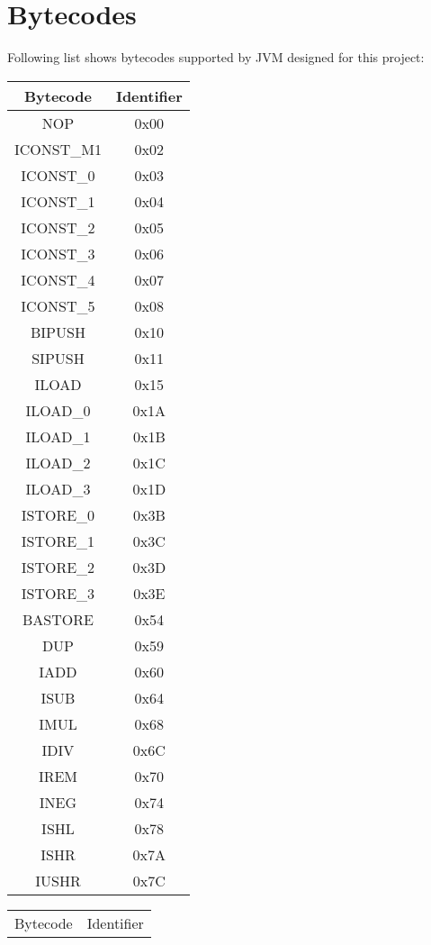 \chapter{Bytecodes}\label{Appx:Bytecodes}
Following list shows bytecodes supported by JVM designed for this project:
\begin{table}[!htb]
\centering
\begin{tabular}{|c|c|}
\hline 
Bytecode & Identifier \\
\hline 
NOP & 0x00 \\
\hline 
ICONST\_M1 & 0x02 \\
\hline 
ICONST\_0 & 0x03 \\
\hline 
ICONST\_1 & 0x04 \\
\hline 
ICONST\_2 & 0x05 \\
\hline 
ICONST\_3 & 0x06 \\
\hline 
ICONST\_4 & 0x07 \\
\hline 
ICONST\_5 & 0x08 \\
\hline 
BIPUSH & 0x10 \\
\hline 
SIPUSH & 0x11 \\
\hline 
ILOAD & 0x15 \\
\hline 
ILOAD\_0 & 0x1A \\
\hline 
ILOAD\_1 & 0x1B \\
\hline 
ILOAD\_2 & 0x1C \\
\hline 
ILOAD\_3 & 0x1D \\
\hline 
ISTORE\_0 & 0x3B \\
\hline 
ISTORE\_1 & 0x3C \\
\hline 
ISTORE\_2 & 0x3D \\
\hline 
ISTORE\_3 & 0x3E \\
\hline 
BASTORE & 0x54 \\
\hline 
DUP & 0x59 \\
\hline 
IADD & 0x60 \\
\hline 
ISUB & 0x64 \\
\hline 
IMUL & 0x68 \\
\hline 
IDIV & 0x6C \\
\hline 
IREM & 0x70 \\
\hline 
INEG & 0x74 \\
\hline 
ISHL & 0x78 \\
\hline 
ISHR & 0x7A \\
\hline 
IUSHR & 0x7C \\
\hline 
\end{tabular}
\quad
\begin{tabular}{|c|c|}
\hline 
Bytecode & Identifier \\

\end{tabular}
\end{table}
